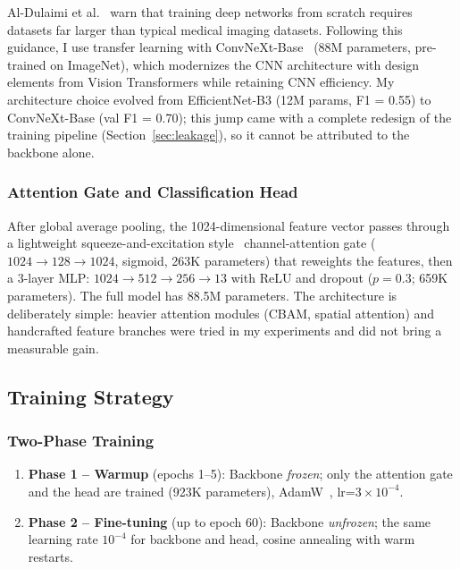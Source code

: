 \documentclass[twocolumn,a4paper]{article}
\begin{document}
Al-Dulaimi et al.~\cite{aldulaimi2018} warn that training deep networks from scratch requires datasets far larger than typical medical imaging datasets. Following this guidance, I use transfer learning with ConvNeXt-Base~\cite{liu2022convnext} (88M parameters, pre-trained on ImageNet), which modernizes the CNN architecture with design elements from Vision Transformers while retaining CNN efficiency. My architecture choice evolved from EfficientNet-B3 (12M params, F1 = 0.55) to ConvNeXt-Base (val F1 = 0.70); this jump came with a complete redesign of the training pipeline (Section~\ref{sec:leakage}), so it cannot be attributed to the backbone alone.

\subsubsection{Attention Gate and Classification Head}

After global average pooling, the 1024-dimensional feature vector passes through a lightweight squeeze-and-excitation style~\cite{hu2018squeeze} channel-attention gate ($1024 \to 128 \to 1024$, sigmoid, 263K parameters) that reweights the features, then a 3-layer MLP: $1024 \to 512 \to 256 \to 13$ with ReLU and dropout ($p=0.3$; 659K parameters). The full model has 88.5M parameters. The architecture is deliberately simple: heavier attention modules (CBAM, spatial attention) and handcrafted feature branches were tried in my experiments and did not bring a measurable gain.

\subsection{Training Strategy}

\subsubsection{Two-Phase Training}

\begin{enumerate}
    \item \textbf{Phase 1 -- Warmup} (epochs 1--5): Backbone \textit{frozen}; only the attention gate and the head are trained (923K parameters), AdamW~\cite{loshchilov2019decoupled}, lr=$3\times10^{-4}$.
    \item \textbf{Phase 2 -- Fine-tuning} (up to epoch 60): Backbone \textit{unfrozen}; the same learning rate $10^{-4}$ for backbone and head, cosine annealing with warm restarts.
\end{enumerate}
\end{document}
